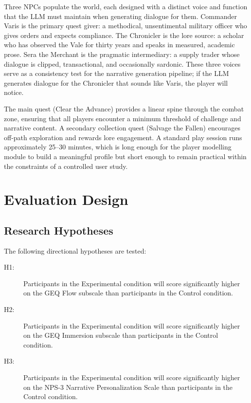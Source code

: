 Three NPCs populate the world, each designed with a distinct voice and function that the LLM must maintain when generating dialogue for them. Commander Varis is the primary quest giver: a methodical, unsentimental military officer who gives orders and expects compliance. The Chronicler is the lore source: a scholar who has observed the Vale for thirty years and speaks in measured, academic prose. Sera the Merchant is the pragmatic intermediary: a supply trader whose dialogue is clipped, transactional, and occasionally sardonic. These three voices serve as a consistency test for the narrative generation pipeline; if the LLM generates dialogue for the Chronicler that sounds like Varis, the player will notice.

The main quest (Clear the Advance) provides a linear spine through the combat zone, ensuring that all players encounter a minimum threshold of challenge and narrative content. A secondary collection quest (Salvage the Fallen) encourages off-path exploration and rewards lore engagement. A standard play session runs approximately 25--30 minutes, which is long enough for the player modelling module to build a meaningful profile but short enough to remain practical within the constraints of a controlled user study.

\section{Evaluation Design}

\subsection{Research Hypotheses}

The following directional hypotheses are tested:

\begin{description}
\item[H1:] Participants in the Experimental condition will score significantly higher on the GEQ Flow subscale than participants in the Control condition.
\item[H2:] Participants in the Experimental condition will score significantly higher on the GEQ Immersion subscale than participants in the Control condition.
\item[H3:] Participants in the Experimental condition will score significantly higher on the NPS-3 Narrative Personalization Scale than participants in the Control condition.
\end{description}

